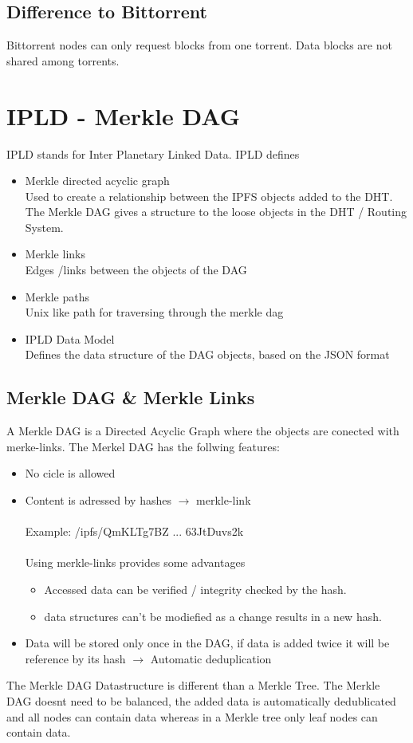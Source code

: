 \documentclass[a4paper,11pt, oneside]{report}
\theoremstyle{definition}
\begin{document}
\subsection{Difference to Bittorrent}

Bittorrent nodes can only request blocks from one torrent. Data blocks are not shared among torrents.


\newpage

\section{IPLD - Merkle DAG}
IPLD stands for Inter Planetary Linked Data. IPLD defines
\begin{itemize}
\item Merkle directed acyclic graph\\ Used to create a relationship between the IPFS objects added to the DHT. The Merkle DAG gives a structure to the loose objects in the DHT / Routing System.
\item Merkle links \\ Edges /links  between the objects of the DAG
\item Merkle paths \\ Unix like path for traversing through the merkle dag
\item IPLD Data Model \\ Defines the data structure of the DAG objects, based on the JSON format
\end{itemize}

\subsection{Merkle DAG \& Merkle Links}
A Merkle DAG is a Directed Acyclic Graph where the objects are conected with merke-links. The Merkel DAG has the follwing features:
\begin{itemize}
\item No cicle is allowed
\item Content is adressed by hashes $\rightarrow$  merkle-link\\ \\
Example:  /ipfs/QmKLTg7BZ ... 63JtDuvs2k\\ \\
Using merkle-links provides some advantages
\begin{itemize}
\item Accessed data can be verified / integrity checked by the hash.  
\item data structures can't be modiefied as a change results in a new hash.
\end{itemize}
\item Data will be stored only once in the DAG, if data is added twice it will be reference by its hash $\rightarrow$ Automatic deduplication
\end{itemize}
The Merkle DAG Datastructure is different than a Merkle Tree. The Merkle DAG doesnt need to be balanced, the added data is automatically dedublicated and all nodes can contain data whereas in a Merkle tree only leaf nodes can contain data.
\end{document}
